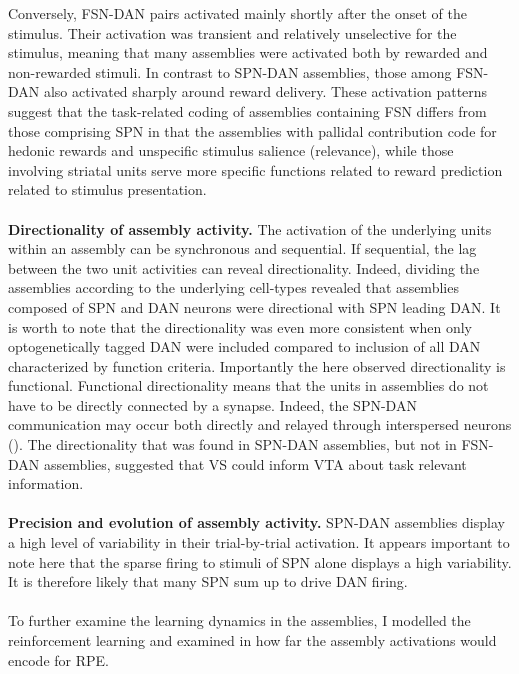 Conversely, FSN-DAN pairs activated mainly shortly after the onset of the stimulus. Their activation was transient and relatively unselective for the stimulus, meaning that many assemblies were activated both by rewarded and non-rewarded stimuli. In contrast to SPN-DAN assemblies, those among FSN-DAN also activated sharply around reward delivery. These activation patterns suggest that the task-related coding of assemblies containing FSN differs from those comprising SPN in that the assemblies with pallidal contribution code for hedonic rewards and unspecific stimulus salience (relevance), while those involving striatal units serve more specific functions related to reward prediction related to stimulus presentation.\\\\
\textbf{Directionality of assembly activity.} The activation of the underlying units within an assembly can be synchronous and sequential. If sequential, the lag between the two unit activities can reveal directionality. Indeed, dividing the assemblies according to the underlying cell-types revealed that assemblies composed of SPN and DAN neurons were directional with SPN leading DAN. It is worth to note that the directionality was even more consistent when only optogenetically tagged DAN were included compared to inclusion of all DAN characterized by function criteria. Importantly the here observed directionality is functional. Functional directionality means that the units in assemblies do not have to be directly connected by a synapse. Indeed, the SPN-DAN communication may occur both directly and relayed through interspersed neurons (\cite{Ikemoto}). The directionality that was found in SPN-DAN assemblies, but not in FSN-DAN assemblies, suggested that VS could inform VTA about task relevant information.\\\\
\textbf{Precision and evolution of assembly activity.} SPN-DAN assemblies display a high level of variability in their trial-by-trial activation. It appears important to note here that the sparse firing to stimuli of SPN alone displays a high variability. It is therefore likely that many SPN sum up to drive DAN firing.\\\\To further examine the learning dynamics in the assemblies, I modelled the reinforcement learning and examined in how far the assembly activations would encode for RPE.\\\\
